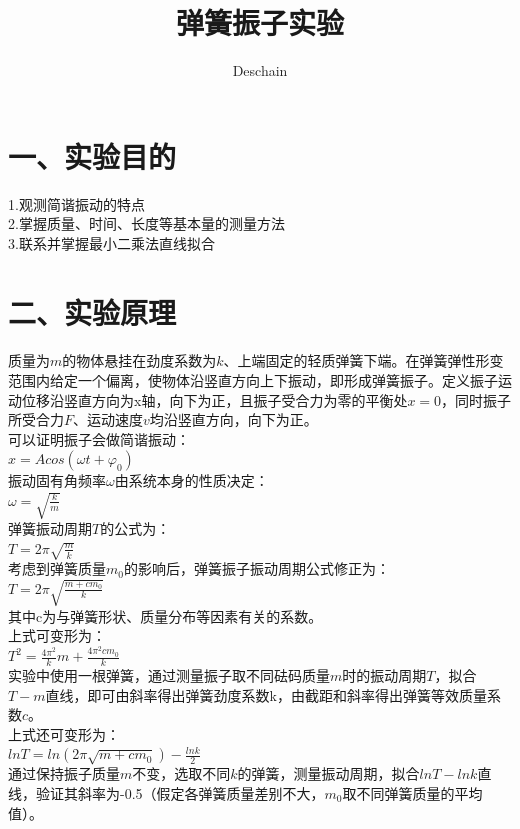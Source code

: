 \documentclass[UTF8]{ctexart}
\title{弹簧振子实验}
\author{Deschain}
\begin{document}
\maketitle
\section*{一、实验目的}
1.观测简谐振动的特点\\
2.掌握质量、时间、长度等基本量的测量方法\\
3.联系并掌握最小二乘法直线拟合\\
\section*{二、实验原理}
\paragraph{}
质量为$m$的物体悬挂在劲度系数为$k$、上端固定的轻质弹簧下端。在弹簧弹性形变范围内给定一个偏离，使物体沿竖直方向上下振动，即形成弹簧振子。定义振子运动位移沿竖直方向为x轴，向下为正，且振子受合力为零的平衡处$x=0$，同时振子所受合力$F$、运动速度$v$均沿竖直方向，向下为正。\\
可以证明振子会做简谐振动：\\
$x=Acos(\omega t+\varphi_0)$\\
振动固有角频率$\omega$由系统本身的性质决定：\\
$\omega=\sqrt{\frac{k}{m}}$\\
弹簧振动周期$T$的公式为：\\
$T=2\pi\sqrt{\frac{m}{k}}$\\
考虑到弹簧质量$m_0$的影响后，弹簧振子振动周期公式修正为：\\
$T=2\pi\sqrt{\frac{m+cm_0}{k}}$\\
其中c为与弹簧形状、质量分布等因素有关的系数。\\
上式可变形为：\\
$T^2=\frac{4\pi^2}{k}m+\frac{4\pi^2cm_0}{k}$\\
实验中使用一根弹簧，通过测量振子取不同砝码质量$m$时的振动周期$T$，拟合$T-m$直线，即可由斜率得出弹簧劲度系数k，由截距和斜率得出弹簧等效质量系数$c$。\\
上式还可变形为：\\
$lnT=ln(2\pi\sqrt{m+cm_0})-\frac{lnk}{2}$\\
通过保持振子质量$m$不变，选取不同$k$的弹簧，测量振动周期，拟合$lnT-lnk$直线，验证其斜率为-0.5（假定各弹簧质量差别不大，$m_0$取不同弹簧质量的平均值）。\\
\end{document}
